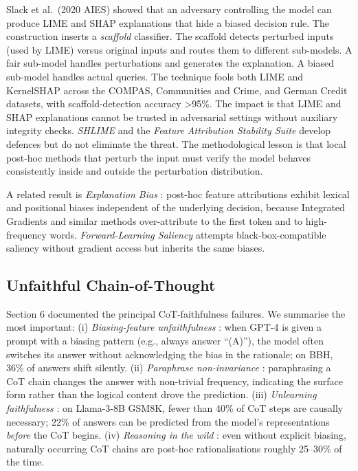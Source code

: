 \documentclass{article}
\begin{document}
Slack et al.~(2020 AIES) showed that an adversary controlling the model can produce LIME and SHAP explanations that hide a biased decision rule. The construction inserts a \emph{scaffold} classifier. The scaffold detects perturbed inputs (used by LIME) versus original inputs and routes them to different sub-models. A fair sub-model handles perturbations and generates the explanation. A biased sub-model handles actual queries. The technique fools both LIME and KernelSHAP across the COMPAS, Communities and Crime, and German Credit datasets, with scaffold-detection accuracy \textgreater95\%. The impact is that LIME and SHAP explanations cannot be trusted in adversarial settings without auxiliary integrity checks. \emph{SHLIME} \citep{chauhan2025shlimefoilingadver} and the \emph{Feature Attribution Stability Suite} \citep{subramaniakuppusamy2026featureattribution} develop defences but do not eliminate the threat. The methodological lesson is that local post-hoc methods that perturb the input must verify the model behaves consistently inside and outside the perturbation distribution.

A related result is \emph{Explanation Bias} \citep{kamp2025explanationbiasisa}: post-hoc feature attributions exhibit lexical and positional biases independent of the underlying decision, because Integrated Gradients and similar methods over-attribute to the first token and to high-frequency words. \emph{Forward-Learning Saliency} \citep{zhang2024acomprehensivestud} attempts black-box-compatible saliency without gradient access but inherits the same biases.

\subsection{Unfaithful Chain-of-Thought}\label{unfaithful-chain-of-thought}

Section 6 documented the principal CoT-faithfulness failures. We summarise the most important: (i) \emph{Biasing-feature unfaithfulness} \citep{turpin2023languagemodelsdont}: when GPT-4 is given a prompt with a biasing pattern (e.g., always answer ``(A)''), the model often switches its answer without acknowledging the bias in the rationale; on BBH, 36\% of answers shift silently. (ii) \emph{Paraphrase non-invariance} \citep{lanham2023measuringfaithfuln}: paraphrasing a CoT chain changes the answer with non-trivial frequency, indicating the surface form rather than the logical content drove the prediction. (iii) \emph{Unlearning faithfulness} \citep{tutek2025measuringchainofth}: on Llama-3-8B GSM8K, fewer than 40\% of CoT steps are causally necessary; 22\% of answers can be predicted from the model's representations \emph{before} the CoT begins. (iv) \emph{Reasoning in the wild} \citep{arcuschin2025chainofthoughtreas}: even without explicit biasing, naturally occurring CoT chains are post-hoc rationalisations roughly 25--30\% of the time.
\end{document}
